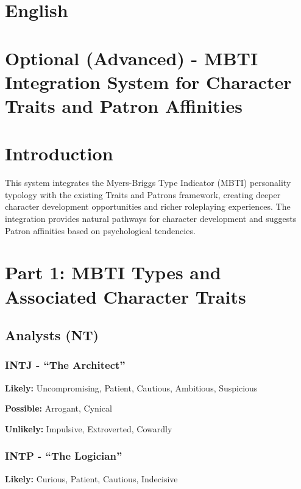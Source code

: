 \documentclass[a4paper,twoside,openany]{book}
\begin{document}

\pagebreak


\section{English}

\pagebreak

\section{Optional (Advanced) - MBTI Integration System for Character Traits and Patron Affinities}

\begin{multicols}{2}

	\section*{Introduction}
	This system integrates the Myers-Briggs Type Indicator (MBTI) personality typology with the existing Traits and Patrons framework, creating deeper character development opportunities and richer roleplaying experiences. The integration provides natural pathways for character development and suggests Patron affinities based on psychological tendencies.

	\section*{Part 1: MBTI Types and Associated Character Traits}

	\subsection*{Analysts (NT)}
	\subsubsection*{INTJ - ``The Architect''}
	\textbf{Likely:} Uncompromising, Patient, Cautious, Ambitious, Suspicious

	\textbf{Possible:} Arrogant, Cynical

	\textbf{Unlikely:} Impulsive, Extroverted, Cowardly

	\subsubsection*{INTP - ``The Logician''}
	\textbf{Likely:} Curious, Patient, Cautious, Indecisive


\end{multicols}
\end{document}
